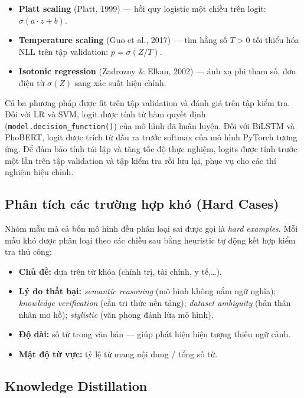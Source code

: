 \begin{itemize}[leftmargin=2em]
  \item \textbf{Platt scaling} (Platt, 1999) --- hồi quy logistic một chiều trên logit: $\sigma(a \cdot z + b)$.
  \item \textbf{Temperature scaling} (Guo et al., 2017) --- tìm hằng số $T > 0$ tối thiểu hóa NLL trên tập validation: $p = \sigma(Z / T)$.
  \item \textbf{Isotonic regression} (Zadrozny \& Elkan, 2002) --- ánh xạ phi tham số, đơn điệu từ $\sigma(Z)$ sang xác suất hiệu chỉnh.
\end{itemize}

Cả ba phương pháp được fit trên tập validation và đánh giá trên tập kiểm tra. Đối với LR và SVM, logit được tính từ hàm quyết định (\texttt{model.decision\_function()}) của mô hình đã huấn luyện. Đối với BiLSTM và PhoBERT, logit được trích từ đầu ra trước softmax của mô hình PyTorch tương ứng. Để đảm bảo tính tái lập và tăng tốc độ thực nghiệm, logits được tính trước một lần trên tập validation và tập kiểm tra rồi lưu lại, phục vụ cho các thí nghiệm hiệu chỉnh.

\subsection{Phân tích các trường hợp khó (Hard Cases)}

Nhóm mẫu mà cả bốn mô hình đều phân loại sai được gọi là \textit{hard examples}. Mỗi mẫu khó được phân loại theo các chiều sau bằng heuristic tự động kết hợp kiểm tra thủ công:

\begin{itemize}[leftmargin=2em]
  \item \textbf{Chủ đề:} dựa trên từ khóa (chính trị, tài chính, y tế,\ldots).
  \item \textbf{Lý do thất bại:} \textit{semantic reasoning} (mô hình không nắm ngữ nghĩa); \textit{knowledge verification} (cần tri thức nền tảng); \textit{dataset ambiguity} (bản thân nhãn mơ hồ); \textit{stylistic} (văn phong đánh lừa mô hình).
  \item \textbf{Độ dài:} số từ trong văn bản --- giúp phát hiện hiện tượng thiếu ngữ cảnh.
  \item \textbf{Mật độ từ vực:} tỷ lệ từ mang nội dung / tổng số từ.
\end{itemize}

\subsection{Knowledge Distillation}

